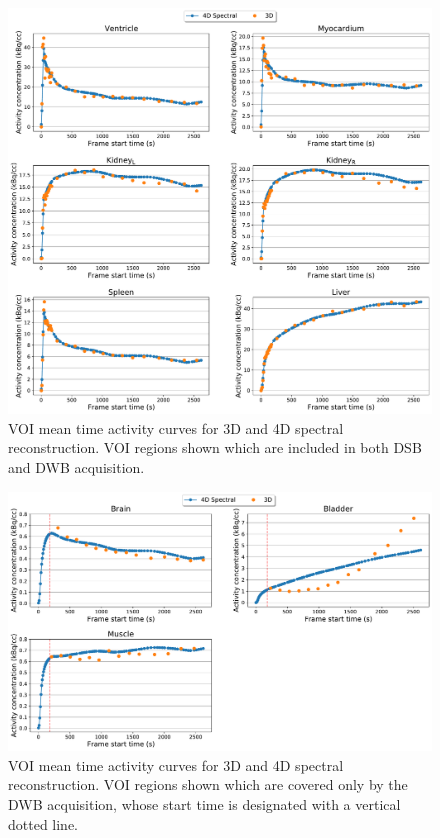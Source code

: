 \begin{figure} [h!]
\centering
\includegraphics[scale=0.5,angle=0]{3_Results/3_3_DWB_Reconstruction/figures/3_3_IsotoPK_CTRL_DWB_3D_vs_4D_central.pdf}
\caption{VOI mean time activity curves for 3D and 4D spectral reconstruction. VOI regions shown which are included in both DSB and DWB acquisition.}
\label{fig_3_3:IsotoPK_CTRL_DWB_4D_vs_3D_Central}
\end{figure}

\begin{figure} [h!]
\centering
\includegraphics[scale=0.5,angle=0]{3_Results/3_3_DWB_Reconstruction/figures/3_3_IsotoPK_CTRL_DWB_3D_vs_4D_peripheral.pdf}
\caption{VOI mean time activity curves for 3D and 4D spectral reconstruction. VOI regions shown which are covered only by the DWB acquisition, whose start time is designated with a vertical dotted line.}
\label{fig_3_3:IsotoPK_CTRL_DWB_4D_vs_3D_Peripheral}
\end{figure} 

